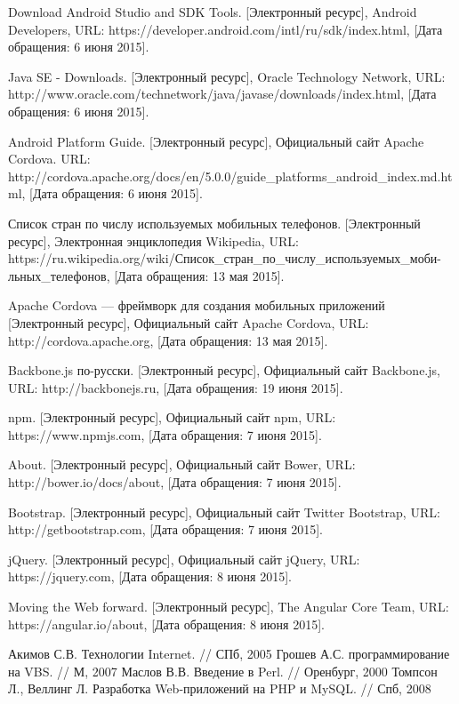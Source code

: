 \begin{thebibliography}{1}
 Download Android Studio and SDK Tools. [Электронный ресурс], Android Developers, URL: https://developer.android.com/intl/ru/sdk/index.html, [Дата обращения: 6 июня 2015].

 Java SE - Downloads. [Электронный ресурс], Oracle Technology Network, URL: http://www.oracle.com/technetwork/java/javase/downloads/index.html, [Дата обращения: 6 июня 2015].

 Android Platform Guide. [Электронный ресурс],  Официальный сайт Apache Cordova. URL: http://cordova.apache.org/docs/en/5.0.0/guide\_platforms\_android\_index.md.html, [Дата обращения: 6 июня 2015].

 Список стран по числу используемых мобильных телефонов. [Электронный ресурс], Электронная энциклопедия Wikipedia, URL: https://ru.wikipedia.org/wiki/Список\_стран\_по\_числу\_используемых\_моби- льных\_телефонов, [Дата обращения: 13 мая 2015].

 Apache Cordova --- фреймворк для создания мобильных приложений [Электронный ресурс], Официальный сайт Apache Cordova, URL: http://cordova.apache.org, [Дата обращения: 13 мая 2015].

 Backbone.js по-русски. [Электронный ресурс], Официальный сайт Backbone.js, URL: http://backbonejs.ru, [Дата обращения: 19 июня 2015].

 npm. [Электронный ресурс], Официальный сайт npm, URL: https://www.npmjs.com, [Дата обращения: 7 июня 2015].

 About. [Электронный ресурс], Официальный сайт Bower, URL: http://bower.io/docs/about, [Дата обращения: 7 июня 2015].

 Bootstrap. [Электронный ресурс], Официальный сайт  Twitter Bootstrap, URL: http://getbootstrap.com, [Дата обращения: 7 июня 2015].

 jQuery. [Электронный ресурс], Официальный сайт jQuery, URL: https://jquery.com, [Дата обращения: 8 июня 2015].

 Moving the Web forward. [Электронный ресурс], The Angular Core Team, URL: https://angular.io/about, [Дата обращения: 8 июня 2015].

 Акимов С.В. Технологии Internet. // СПб, 2005
 Грошев А.С. программирование на VBS. // М, 2007
 Маслов В.В. Введение в Perl. // Оренбург, 2000
 Томпсон Л., Веллинг Л. Разработка Web-приложений на PHP и MySQL. // Спб, 2008

\end{thebibliography}
